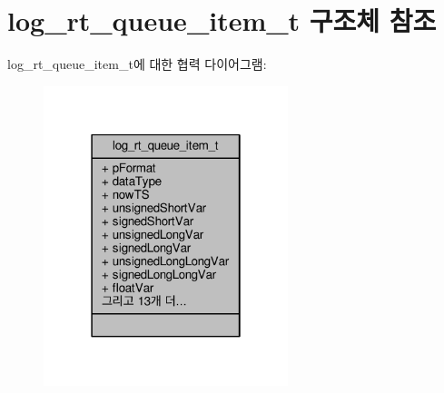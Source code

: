 \hypertarget{structlog__rt__queue__item__t}{}\section{log\+\_\+rt\+\_\+queue\+\_\+item\+\_\+t 구조체 참조}
\label{structlog__rt__queue__item__t}


log\+\_\+rt\+\_\+queue\+\_\+item\+\_\+t에 대한 협력 다이어그램\+:
\nopagebreak
\begin{figure}[H]
\begin{center}
\leavevmode
\includegraphics[width=202pt]{structlog__rt__queue__item__t__coll__graph}
\end{center}
\end{figure}
